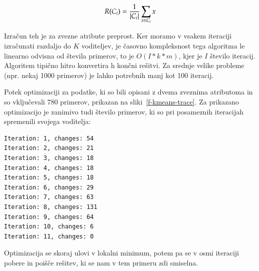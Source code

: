 $$ R(C_i) = {1\over |C_i|} \sum_{x\in C_i}x $$

Izračun teh je za zvezne atribute preprost. Ker moramo v vsakem iteraciji izračunati razdaljo do $K$ voditeljev, je časovno kompleksnost tega algoritma le linearno odvisna od števila primerov, to je $O(I*k*m)$, kjer je $I$ število iteracij. Algoritem tipično hitro konvertira h končni rešitvi. Za srednje velike probleme (npr. nekaj 1000 primerov) je lahko potrebnih manj kot 100 iteracij.

Potek optimizaciji za podatke, ki so bili opisani z dvema zveznima atributoma in so vključevali 780 primerov, prikazan na sliki~\ref{f-kmeans-trace}. Za prikazano optimizacijo je zanimivo tudi število primerov, ki so pri posameznih iteracijah spremenili svojega voditelja:
%
\begin{verbatim}
Iteration: 1, changes: 54
Iteration: 2, changes: 21
Iteration: 3, changes: 18
Iteration: 4, changes: 18
Iteration: 5, changes: 18
Iteration: 6, changes: 29
Iteration: 7, changes: 63
Iteration: 8, changes: 131
Iteration: 9, changes: 64
Iteration: 10, changes: 6
Iteration: 11, changes: 0
\end{verbatim}
%
Optimizacija se skoraj ulovi v lokalni minimum, potem pa se v osmi
iteraciji pobere in poišče rešitev, ki se nam v tem primeru zdi smiselna.

